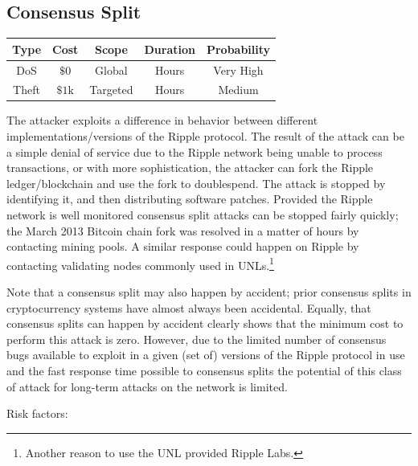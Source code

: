 \documentclass{article}
\begin{document}
\subsection{Consensus Split}

\begin{center}
    \begin{tabular}{c|c|c|c|c}
        Type & Cost & Scope & Duration & Probability \\ \hline
        DoS   & $\$0$ & Global & Hours & Very High \\
        Theft & $\$1\text{k}$ & Targeted & Hours & Medium
    \end{tabular}
\end{center}

The attacker exploits a difference in behavior between different
implementations/versions of the Ripple protocol. The result of the attack can
be a simple denial of service due to the Ripple network being unable to process
transactions, or with more sophistication, the attacker can fork the Ripple
ledger/blockchain and use the fork to doublespend. The attack is stopped by
identifying it, and then distributing software patches. Provided the Ripple
network is well monitored consensus split attacks can be stopped fairly
quickly; the March 2013 Bitcoin chain fork\cite{bip50} was resolved in a matter
of hours by contacting mining pools. A similar response could happen on Ripple
by contacting validating nodes commonly used in UNLs.\footnote{Another reason
to use the UNL provided Ripple Labs.}

Note that a consensus split may also happen by accident; prior consensus splits
in cryptocurrency systems have almost always been accidental. Equally, that
consensus splits can happen by accident clearly shows that the minimum cost to
perform this attack is zero. However, due to the limited number of consensus
bugs available to exploit in a given (set of) versions of the Ripple protocol
in use and the fast response time possible to consensus splits the potential of
this class of attack for long-term attacks on the network is limited.

Risk factors:
\end{document}
